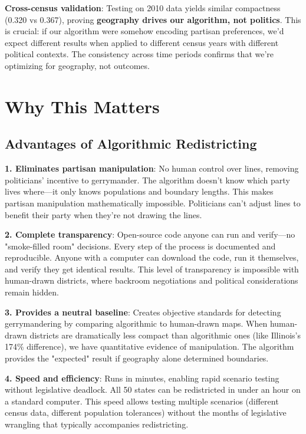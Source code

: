 \documentclass[11pt]{article}
\begin{document}
\textbf{Cross-census validation}: Testing on 2010 data yields similar compactness (0.320 vs 0.367), proving \textbf{geography drives our algorithm, not politics}. This is crucial: if our algorithm were somehow encoding partisan preferences, we'd expect different results when applied to different census years with different political contexts. The consistency across time periods confirms that we're optimizing for geography, not outcomes.

\section{Why This Matters}

\subsection{Advantages of Algorithmic Redistricting}

\textbf{1. Eliminates partisan manipulation}: No human control over lines, removing politicians' incentive to gerrymander. The algorithm doesn't know which party lives where—it only knows populations and boundary lengths. This makes partisan manipulation mathematically impossible. Politicians can't adjust lines to benefit their party when they're not drawing the lines.

\textbf{2. Complete transparency}: Open-source code anyone can run and verify—no "smoke-filled room" decisions. Every step of the process is documented and reproducible. Anyone with a computer can download the code, run it themselves, and verify they get identical results. This level of transparency is impossible with human-drawn districts, where backroom negotiations and political considerations remain hidden.

\textbf{3. Provides a neutral baseline}: Creates objective standards for detecting gerrymandering by comparing algorithmic to human-drawn maps. When human-drawn districts are dramatically less compact than algorithmic ones (like Illinois's 174\% difference), we have quantitative evidence of manipulation. The algorithm provides the "expected" result if geography alone determined boundaries.

\textbf{4. Speed and efficiency}: Runs in minutes, enabling rapid scenario testing without legislative deadlock. All 50 states can be redistricted in under an hour on a standard computer. This speed allows testing multiple scenarios (different census data, different population tolerances) without the months of legislative wrangling that typically accompanies redistricting.
\end{document}

